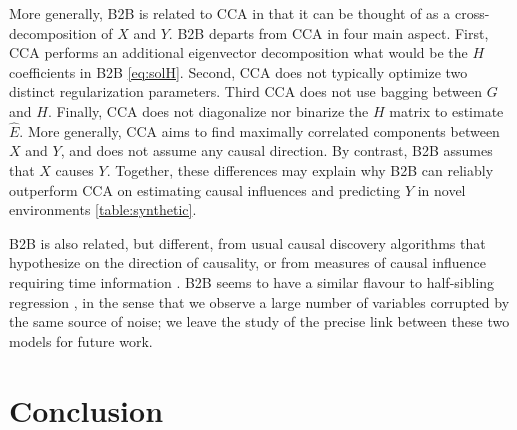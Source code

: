 \documentclass{article}
\begin{document}
More generally, B2B is related to CCA \citep{cca_hotelling} in that it can be thought of as a cross-decomposition of $X$ and $Y$. B2B departs from CCA in four main aspect. First, CCA performs an additional eigenvector decomposition what would be the $H$ coefficients in B2B \eqref{eq:solH}. Second, CCA does not typically optimize two distinct regularization parameters. Third CCA does not use bagging between $G$ and $H$. Finally, CCA does not diagonalize nor binarize the $H$ matrix to estimate $\hat E$. More generally, CCA aims to find maximally correlated components between $X$ and $Y$, and does not assume any causal direction. By contrast, B2B assumes that $X$ causes $Y$. Together, these differences may explain why B2B can reliably outperform CCA on estimating causal influences and predicting $Y$ in novel environments \ref{table:synthetic}.
%


B2B is also related, but different, from usual causal discovery algorithms \citep{peters2017elements} that hypothesize on the direction of causality, or from measures of causal influence requiring time information \citep{granger1969investigating, janzing2013quantifying}.
%
B2B seems to have a similar flavour to half-sibling regression \citep{scholkopf2016modeling}, in the sense that we observe a large number of variables corrupted by the same source of noise; we leave the study of the precise link between these two models for future work.


\section{Conclusion}

\end{document}
